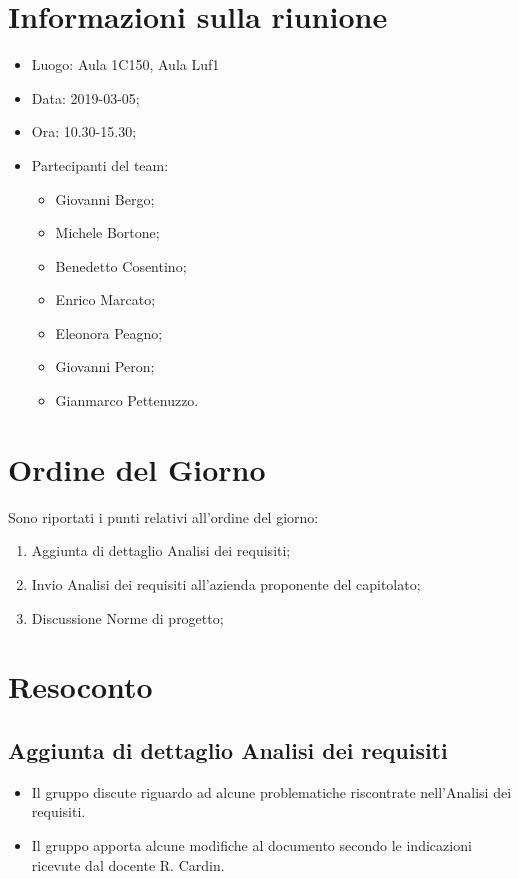 \documentclass[11pt,a4paper]{article}
\begin{document}
	\section{Informazioni sulla riunione}
	\begin{itemize}
		\item Luogo: Aula 1C150, Aula Luf1
		\item Data: 2019-03-05;
		\item Ora: 10.30-15.30;
		\item Partecipanti del team:
			\begin{itemize}
				\item Giovanni Bergo;
				\item Michele Bortone;
				\item Benedetto Cosentino;
				\item Enrico Marcato;
				\item Eleonora Peagno;
				\item Giovanni Peron;
				\item Gianmarco Pettenuzzo.
				
			\end{itemize}
	\end{itemize}
	
	\section{Ordine del Giorno}
	Sono riportati i punti relativi all'ordine del giorno:
	\begin{enumerate}
		\item Aggiunta di dettaglio Analisi dei requisiti;
		\item Invio Analisi dei requisiti all'azienda proponente del capitolato;
		\item Discussione Norme di progetto;
	\end{enumerate}
	
	\section{Resoconto}
	\subsection{Aggiunta di dettaglio Analisi dei requisiti}
	\begin{itemize}
		\item Il gruppo discute riguardo ad alcune problematiche riscontrate nell'Analisi dei requisiti.
		\item Il gruppo apporta alcune modifiche al documento secondo le indicazioni ricevute dal docente R. Cardin.
	\end{itemize}
	
\end{document}
